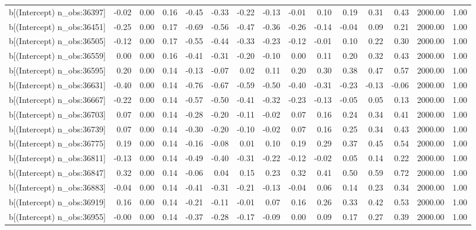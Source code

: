 \begin{table}[ht]
\begin{tabular}{rrrrrrrrrrrrrrr}
  b[(Intercept) n\_obs:36397] & -0.02 & 0.00 & 0.16 & -0.45 & -0.33 & -0.22 & -0.13 & -0.01 & 0.10 & 0.19 & 0.31 & 0.43 & 2000.00 & 1.00 \\ 
  b[(Intercept) n\_obs:36451] & -0.25 & 0.00 & 0.17 & -0.69 & -0.56 & -0.47 & -0.36 & -0.26 & -0.14 & -0.04 & 0.09 & 0.21 & 2000.00 & 1.00 \\ 
  b[(Intercept) n\_obs:36505] & -0.12 & 0.00 & 0.17 & -0.55 & -0.44 & -0.33 & -0.23 & -0.12 & -0.01 & 0.10 & 0.22 & 0.30 & 2000.00 & 1.00 \\ 
  b[(Intercept) n\_obs:36559] & 0.00 & 0.00 & 0.16 & -0.41 & -0.31 & -0.20 & -0.10 & 0.00 & 0.11 & 0.20 & 0.32 & 0.43 & 2000.00 & 1.00 \\ 
  b[(Intercept) n\_obs:36595] & 0.20 & 0.00 & 0.14 & -0.13 & -0.07 & 0.02 & 0.11 & 0.20 & 0.30 & 0.38 & 0.47 & 0.57 & 2000.00 & 1.00 \\ 
  b[(Intercept) n\_obs:36631] & -0.40 & 0.00 & 0.14 & -0.76 & -0.67 & -0.59 & -0.50 & -0.40 & -0.31 & -0.23 & -0.13 & -0.06 & 2000.00 & 1.00 \\ 
  b[(Intercept) n\_obs:36667] & -0.22 & 0.00 & 0.14 & -0.57 & -0.50 & -0.41 & -0.32 & -0.23 & -0.13 & -0.05 & 0.05 & 0.13 & 2000.00 & 1.00 \\ 
  b[(Intercept) n\_obs:36703] & 0.07 & 0.00 & 0.14 & -0.28 & -0.20 & -0.11 & -0.02 & 0.07 & 0.16 & 0.24 & 0.34 & 0.41 & 2000.00 & 1.00 \\ 
  b[(Intercept) n\_obs:36739] & 0.07 & 0.00 & 0.14 & -0.30 & -0.20 & -0.10 & -0.02 & 0.07 & 0.16 & 0.25 & 0.34 & 0.43 & 2000.00 & 1.00 \\ 
  b[(Intercept) n\_obs:36775] & 0.19 & 0.00 & 0.14 & -0.16 & -0.08 & 0.01 & 0.10 & 0.19 & 0.29 & 0.37 & 0.45 & 0.54 & 2000.00 & 1.00 \\ 
  b[(Intercept) n\_obs:36811] & -0.13 & 0.00 & 0.14 & -0.49 & -0.40 & -0.31 & -0.22 & -0.12 & -0.02 & 0.05 & 0.14 & 0.22 & 2000.00 & 1.00 \\ 
  b[(Intercept) n\_obs:36847] & 0.32 & 0.00 & 0.14 & -0.06 & 0.04 & 0.15 & 0.23 & 0.32 & 0.41 & 0.50 & 0.59 & 0.72 & 2000.00 & 1.00 \\ 
  b[(Intercept) n\_obs:36883] & -0.04 & 0.00 & 0.14 & -0.41 & -0.31 & -0.21 & -0.13 & -0.04 & 0.06 & 0.14 & 0.23 & 0.34 & 2000.00 & 1.00 \\ 
  b[(Intercept) n\_obs:36919] & 0.16 & 0.00 & 0.14 & -0.21 & -0.11 & -0.01 & 0.07 & 0.16 & 0.26 & 0.33 & 0.42 & 0.53 & 2000.00 & 1.00 \\ 
  b[(Intercept) n\_obs:36955] & -0.00 & 0.00 & 0.14 & -0.37 & -0.28 & -0.17 & -0.09 & 0.00 & 0.09 & 0.17 & 0.27 & 0.39 & 2000.00 & 1.00 \\ 

\end{tabular}
\end{table}

